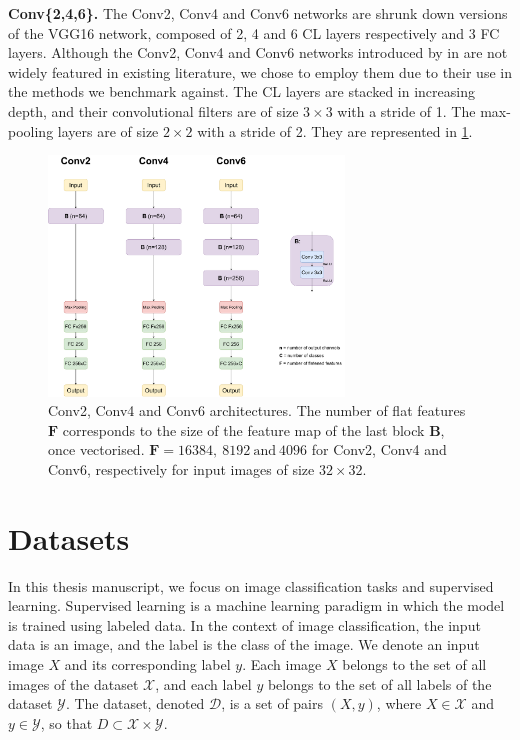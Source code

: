 \noindent \textbf{Conv\{2,4,6\}.} The Conv2, Conv4 and Conv6 networks are shrunk
down versions of the VGG16 network, composed of 2, 4 and 6 \ac{CL} layers
respectively and 3 \ac{FC} layers. Although the Conv2, Conv4 and Conv6 networks
introduced by \citeauthor{DBLP:conf/iclr/FrankleC19} in
\cite{DBLP:conf/iclr/FrankleC19} are not widely featured in existing literature,
we chose to employ them due to their use in the methods we benchmark against.
The \ac{CL} layers are stacked in increasing depth, and their
convolutional filters are of size $3\times 3$ with a stride of 1. The
max-pooling layers are of size $2\times 2$ with a stride of 2. They are
represented in \cref{fig:dlo:conv246}.\\

\begin{figure}[htbp]
  \centering
  \includegraphics[width=0.7\textwidth]{chapter_dlo/assets/conv246.pdf}
  \caption{Conv2, Conv4 and Conv6 architectures. The number of flat features
  $\mathbf{F}$ corresponds to the size of the feature map of the last block
  $\mathbf{B}$, once vectorised. $\mathbf{F}=16384, ~8192~ \text{and}~ 4096$ for Conv2, Conv4
  and Conv6, respectively for input images of size $32\times 32$.}
  \label{fig:dlo:conv246}
\end{figure}


\section{Datasets}\label{sec:dlo:datasets}

In this thesis manuscript, we focus on image classification tasks and supervised
learning. Supervised learning is a machine learning paradigm in which the model
is trained using labeled data. In the context of image classification, the input
data is an image, and the label is the class of the image. We denote an input
image $X$ and its corresponding label $y$. Each image $X$ belongs to the set of
all images of the dataset $\mathcal{X}$, and each label $y$ belongs to the set
of all labels of the dataset $\mathcal{Y}$. The dataset, denoted $\mathcal{D}$,
is a set of pairs $(X, y)$, where $X \in \mathcal{X}$ and $y \in \mathcal{Y}$,
so that $D \subset \mathcal{X} \times \mathcal{Y}$. \\

